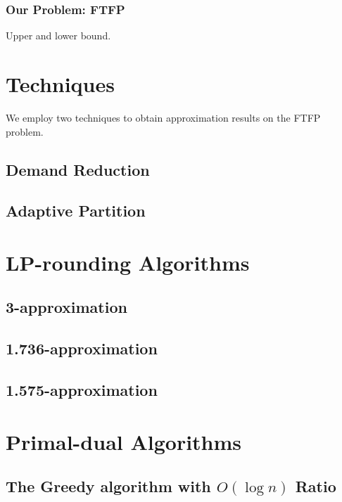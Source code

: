 \documentclass[oneside,final]{ucr}
\begin{document}
\subsection{Our Problem: FTFP}
Upper and lower bound.


\chapter{Techniques} \label{ch: techniques}

We employ two techniques to obtain approximation results on the FTFP
problem.

\section{Demand Reduction}

\section{Adaptive Partition}

\chapter{LP-rounding Algorithms} \label{ch: lp-rounding}

\section{3-approximation}

\section{1.736-approximation}

\section{1.575-approximation}

\chapter{Primal-dual Algorithms} \label{ch: primal-dual}

\section{The Greedy algorithm with $O(\log n)$ Ratio}
\end{document}
